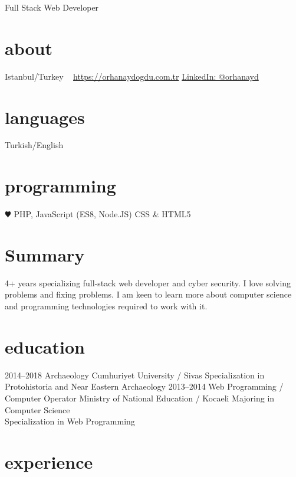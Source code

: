 \documentclass[]{friggeri-cv}
\begin{document}
       {Full Stack Web Developer}


\begin{aside}
  \section{about}
    Istanbul/Turkey
    ~
    \href{mailto:info@orhanaydogdu.com.tr}
    \href{https://orhanaydogdu.com.tr?lang=en}{https://orhanaydogdu.com.tr}
    \href{https://www.linkedin.com/in/orhanayd/}{LinkedIn: @orhanayd}
  \section{languages}
    Turkish/English
  \section{programming}
    {\color{red} $\varheartsuit$} PHP, JavaScript
    (ES8, Node.JS)
    CSS \& HTML5
\end{aside}

\section{Summary}

4+ years specializing full-stack web developer and cyber security. I love solving problems and fixing problems. I am keen to learn more about computer science and programming technologies required to work with it.

\section{education}

\begin{entrylist}
  \entry
    {2014–2018}
    {Archaeology}
    {Cumhuriyet University / Sivas}
    {Specialization in Protohistoria and Near Eastern Archaeology}
  \entry
    {2013–2014}
    {Web Programming / Computer Operator}
    {Ministry of National Education / Kocaeli}
    {Majoring in Computer Science\\
    Specialization in Web Programming}
\end{entrylist}

\section{experience}
\end{document}
